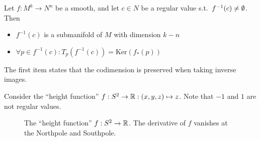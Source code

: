 \begin{theorem}
    Let $f: M^{k} \to  N^{n}$ be a smooth, and let $c \in N$ be a regular value s.t.\ $f^{-1}(c) \neq \emptyset$.
    Then 
    \begin{itemize}
        \item $f^{-1}(c)$ is a submanifold of $M$ with dimension $k - n$
        \item $\forall  p \in  f^{-1}(c): T_p(f^{-1}(c)) = \text{Ker}(f_*(p))$
    \end{itemize}
    \end{theorem}
    
The first item states that the codimension is preserved when taking inverse images.    
\begin{eg}
Consider the ``height function'' $f: S^2 \to \mathbb{R}: (x, y, z) \mapsto z$.
    Note that $-1$ and $1$ are not regular values. 
\end{eg}

\begin{figure}[ht]
    \centering
    \caption{The ``height function'' $f: S^2 \to \mathbb{R}$. The derivative of $f$ vanishes at the Northpole and Southpole.}
    \label{fig:example-submersion}
\end{figure}





